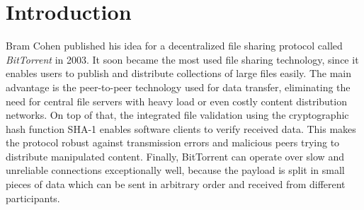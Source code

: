 \documentclass[10pt, a4paper, twoside=false, headsepline]{scrbook}
\renewcommand{\_}{\origunderscore\allowbreak}
\begin{document}
\chapter{Introduction}
\pagestyle{scrheadings}
Bram Cohen published \cite{cohen2003incentives} his idea for a decentralized file sharing protocol called \emph{BitTorrent} in 2003. It soon became the most used file sharing technology, since it enables users to publish and distribute collections of large files easily. The main advantage is the peer-to-peer technology used for data transfer, eliminating the need for central file servers with heavy load or even costly content distribution networks. On top of that, the integrated file validation using the cryptographic hash function SHA-1 enables software clients to verify received data. This makes the protocol robust against transmission errors and malicious peers trying to distribute manipulated content. Finally, BitTorrent can operate over slow and unreliable connections exceptionally well, because the payload is split in small pieces of data which can be sent in arbitrary order and received from different participants.
\end{document}
